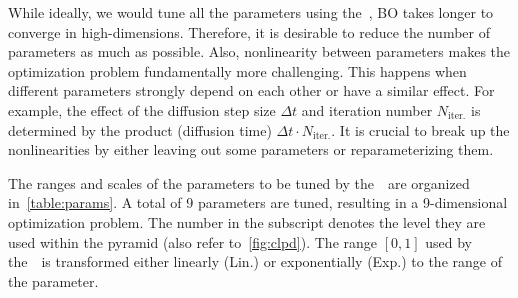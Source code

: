 While ideally, we would tune all the parameters using the~\usdg, BO takes longer to converge in high-dimensions.
Therefore, it is desirable to reduce the number of parameters as much as possible.
Also, nonlinearity between parameters makes the optimization problem fundamentally more challenging.
This happens when different parameters strongly depend on each other or have a similar effect.
For example, the effect of the diffusion step size \(\Delta t\) and iteration number \(N_{\text{iter.}}\) is determined by the product (diffusion time) \(\Delta t \cdot N_{\text{iter.}}\).
It is crucial to break up the nonlinearities by either leaving out some parameters or reparameterizing them.

The ranges and scales of the parameters to be tuned by the~\usdg~are organized in~\cref{table:params}.
A total of 9 parameters are tuned, resulting in a 9-dimensional optimization problem.
The number in the subscript denotes the level they are used within the pyramid (also refer to~\cref{fig:clpd}).
The range \([0, 1]\) used by the~\usdg~is transformed either linearly (Lin.) or exponentially (Exp.) to the range of the parameter.



